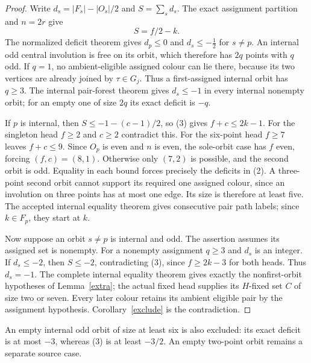 \documentclass[11pt,a4paper]{article}
\begin{document}
\begin{proof}
Write $d_s=|F_s|-|O_s|/2$ and $S=\sum_s d_s$.
The exact assignment partition and $n=2r$ give
\[
                       S=f/2-k.                         \tag{3}
\]
The normalized deficit theorem gives $d_p\le0$ and
$d_s\le-\tfrac12$ for $s\ne p$. An internal odd central
involution is free on its orbit, which therefore has $2q$ points
with $q$ odd. If $q=1$, no ambient-eligible assigned colour can
lie there, because its two vertices are already joined by
$\tau\in G_j$. Thus a first-assigned internal orbit has $q\ge3$.
The internal pair-forest theorem gives $d_s\le-1$ in every
internal nonempty orbit; for an empty one of size $2q$ its
exact deficit is $-q$.

If $p$ is internal, then
$S\le-1-(c-1)/2$, so (3) gives $f+c\le2k-1$.
For the singleton head $f\ge2$ and $c\ge2$ contradict this.
For the six-point head $f\ge7$ leaves $f+c\le9$.
Since $O_p$ is even and $n$ is even, the sole-orbit case has
$f$ even, forcing $(f,c)=(8,1)$. Otherwise only $(7,2)$ is
possible, and the second orbit is odd. Equality in each bound
forces precisely the deficits in (2). A three-point second orbit
cannot support its required one assigned colour, since an involution
on three points has at most one edge. Its size is therefore at least
five. The accepted internal equality theorem gives consecutive pair
path labels; since $k\in F_p$, they start at $k$.

Now suppose an orbit $s\ne p$ is internal and odd. The assertion assumes its assigned set is nonempty.
For a nonempty assignment $q\ge3$ and $d_s$ is an integer.
If $d_s\le-2$, then $S\le-2$, contradicting (3), since
$f\ge2k-3$ for both heads. Thus $d_s=-1$.
The complete internal equality theorem gives exactly the
nonfirst-orbit hypotheses of Lemma~\ref{extra}; the actual fixed
head supplies its $H$-fixed set $C$ of size two or seven.
Every later colour retains its ambient eligible pair by the
assignment hypothesis. Corollary~\ref{exclude} is the contradiction.
\end{proof}

An empty internal odd orbit of size at least six is also excluded:
its exact deficit is at most $-3$, whereas (3) is at least $-3/2$.
An empty two-point orbit remains a separate source case.
\end{document}
